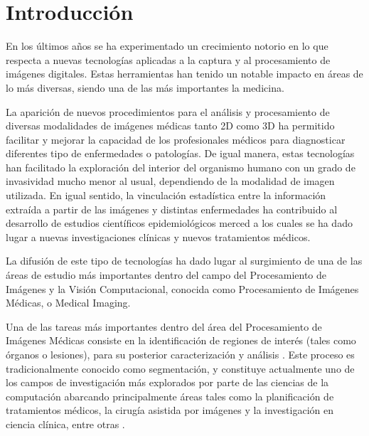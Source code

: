\chapter{Introducción}
En los últimos años se ha experimentado un crecimiento notorio en lo que respecta a nuevas tecnologías aplicadas a la captura y al procesamiento de imágenes digitales. Estas herramientas han tenido un notable impacto en áreas de lo más diversas, siendo una de las más importantes la medicina. 

La aparición de nuevos procedimientos para el análisis y procesamiento de diversas modalidades de imágenes médicas tanto 2D como 3D ha permitido facilitar y mejorar la capacidad de los profesionales médicos para diagnosticar diferentes tipo de enfermedades o patologías. De igual manera, estas tecnologías han facilitado la exploración del interior del organismo humano con un grado de invasividad mucho menor al usual, dependiendo de la modalidad de imagen utilizada. En igual sentido, la vinculación estadística entre la información extraída a partir de las imágenes y distintas enfermedades ha contribuido al desarrollo de estudios científicos epidemiológicos merced a los cuales se ha dado lugar a nuevas investigaciones clínicas y nuevos tratamientos médicos.

La difusión de este tipo de tecnologías ha dado lugar al surgimiento de una de las áreas de estudio más importantes dentro del campo del Procesamiento de Imágenes y la Visión Computacional, conocida como Procesamiento de Imágenes Médicas, o Medical Imaging.

Una de las tareas más importantes dentro del área del Procesamiento de Imágenes
Médicas consiste en la identificación de regiones de interés (tales como órganos o lesiones), para su posterior caracterización y análisis \citep{pham2000current}. Este proceso es tradicionalmente conocido como segmentación, y constituye actualmente uno de los campos de investigación más explorados por parte de las ciencias de la computación abarcando principalmente áreas tales como la planificación de tratamientos médicos, la cirugía asistida por imágenes y la investigación en ciencia clínica, entre otras \citep{bankman2008handbook}.

